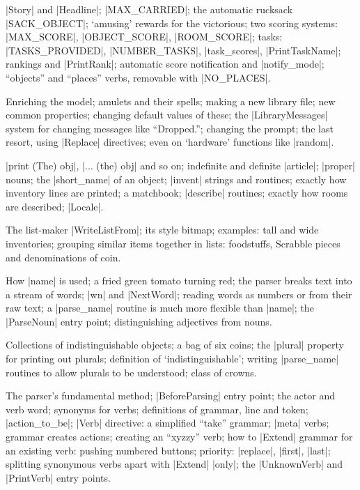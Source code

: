 %
|Story| and |Headline|; |MAX_CARRIED|; the automatic rucksack |SACK_OBJECT|;
`amusing' rewards for the victorious; two scoring systems: |MAX_SCORE|,
|OBJECT_SCORE|, |ROOM_SCORE|; tasks: |TASKS_PROVIDED|, |NUMBER_TASKS|,
|task_scores|, |PrintTaskName|; rankings and |PrintRank|; automatic score
notification and |notify_mode|; ``objects'' and ``places'' verbs, removable
with |NO_PLACES|.

%
Enriching the model; amulets and their spells; making a new library file;
new common properties; changing default values of these; the
|LibraryMessages| system for changing messages like ``Dropped.''; changing
the prompt; the last resort, using |Replace| directives; even on `hardware'
functions like |random|.

\vfill\eject
{}

%
|print (The) obj|, |... (the) obj| and so on; indefinite and
definite |article|; |proper| nouns; the |short_name| of an object;
|invent| strings and routines; exactly how inventory lines are
printed; a matchbook; |describe| routines; exactly how rooms
are described; |Locale|.

%
The list-maker |WriteListFrom|; its style bitmap; examples: tall and
wide inventories; grouping similar items together in lists: foodstuffs,
Scrabble pieces and denominations of coin.

%
How |name| is used; a fried green tomato turning red; the parser breaks
text into a stream of words; |wn| and |NextWord|; reading words as
numbers or from their raw text; a |parse_name| routine is much more
flexible than |name|; the |ParseNoun| entry point; distinguishing
adjectives from nouns.

%
Collections of indistinguishable objects; a bag of six coins; the |plural|
property for printing out plurals; definition of `indistinguishable';
writing |parse_name| routines to allow plurals to be understood; class of
crowns.

%
The parser's fundamental method; |BeforeParsing| entry point; the actor and
verb word; synonyms for verbs; definitions of grammar, line and token;
|action_to_be|; |Verb| directive: a simplified ``take'' grammar; |meta|
verbs; grammar creates actions; creating an ``xyzzy'' verb; how to |Extend|
grammar for an existing verb: pushing numbered buttons; priority: |replace|,
|first|, |last|; splitting synonymous verbs apart with |Extend| |only|; the
|UnknownVerb| and |PrintVerb| entry points.

